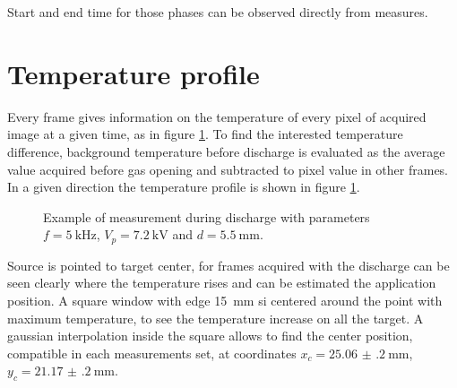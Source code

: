Start and end time for those phases can be observed directly from measures.

\section{Temperature profile}
Every frame gives information on the temperature of every pixel of acquired image at a given time, as in figure \ref{fig:exframe}. To find the interested temperature difference, background temperature before discharge is evaluated as the average value acquired before gas opening and subtracted to pixel value in other frames. In a given direction the temperature profile is shown in figure \ref{fig:exframe}.
\begin{figure}
 \centering
 \hfill
 \caption{Example of measurement during discharge with parameters $f = \SI{5}{\kilo\hertz}$, $V_p = \SI{7.2}{\kilo\volt}$ and $d = \SI{5.5}{\milli\meter}$.}
 \label{fig:exframe}
\end{figure}


Source is pointed to target center, for frames acquired with the discharge can be seen clearly where the temperature rises and can be estimated the application position. A square window with edge \SI{15}{\milli\meter} si centered around the point with maximum temperature, to see the temperature increase on all the target. A gaussian interpolation inside the square allows to find the center position, compatible in each measurements set, at coordinates $x_{c} = \SI{25.06(20)}{\milli\meter}$, $y_{c} = \SI{21.17(20)}{\milli\meter}$.

